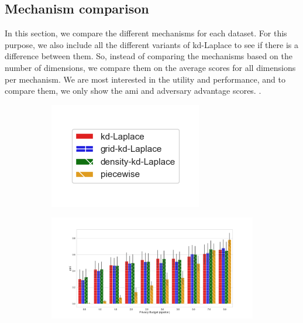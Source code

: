 \subsection{Mechanism comparison}
In this section, we compare the different mechanisms for each dataset.
For this purpose, we also include all the different variants of kd-Laplace to see if there is a difference between them.
So, instead of comparing the mechanisms based on the number of dimensions, we compare them on the average scores for all dimensions per mechanism.
We are most interested in the utility and performance, and to compare them, we only show the \gls{ami} and adversary advantage scores.
.
\begin{figure}[H]
  \centering
  \begin{subfigure}{0.30\textwidth}
    \includegraphics[width=\textwidth]{Results/kd-laplace/ami_bar_comparison_legend.png}
  \end{subfigure}
  \begin{subfigure}{1\textwidth}
    \includegraphics[width=1\textwidth]{Results/nd-laplace/ami_seeds-dataset_comparison.png}

\end{subfigure}
\end{figure}
